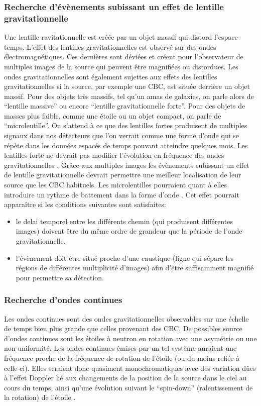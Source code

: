\subsubsection*{Recherche d'évènements subissant un effet de lentille gravitationnelle}
Une lentille ravitationnelle est créée par un objet massif qui distord l'espace-temps.
L'effet des lentilles gravitationnelles est observé sur des ondes électromagnétiques.
Ces dernières sont déviées et créent pour l'observateur de multiples images de la source qui peuvent être magnifiées ou distordues.
Les ondes gravitationnelles sont également sujettes aux effets des lentilles gravitationnelles si la source, par exemple une CBC, est située derrière un objet massif.
Pour des objets très massifs, tel qu'un amas de galaxies, on parle alors de ``lentille massive'' ou encore ``lentille gravitationnelle forte''.
Pour des objets de masses plus faible, comme une étoile ou un objet compact, on parle de ``microlentille''.
On s'attend à ce que des lentilles fortes produisent de multiples signaux dans nos détecteurs que l'on verrait comme une forme d'onde qui se répète dans les données espacés de temps pouvant atteindre quelques mois.
Les lentilles forte ne devrait pas modifier l'évolution en fréquence des ondes gravitationnelles \cite{LVK_lensing}.
Grâce aux  multiples images les évènements subissant un effet de lentille gravitationnelle devrait permettre une meilleur localisation de leur source que les CBC habituels.
Les microlentilles pourraient quant à elles introduire un rythme de battement dans la forme d'onde \cite{lensing_beating}.
Cet effet pourrait apparaître si les conditions suivantes sont satisfaites:
\begin{itemize}
\item le delai temporel entre les différents chemin (qui produisent différentes images) doivent être du même ordre de grandeur que la période de l'onde gravitationnelle.
\item l'évènement doit être situé proche d'une caustique (ligne qui sépare les régions de différentes multiplicité d'images) afin d'être suffisamment magnifié pour permettre sa détection.
\end{itemize}

\subsubsection*{Recherche d'ondes continues}
Les ondes continues sont des ondes gravitationnelles observables sur une échelle de temps bien plus grande que celles provenant des CBC.
De possibles source d'ondes continues sont les étoiles à neutron en rotation avec une asymétrie ou une non-uniformité.
Les ondes continues émises par un tel système auraient une fréquence proche de la fréquence de rotation de l'étoile (ou du moins reliée à celle-ci).
Elles seraient donc quasiment monochromatiques avec des variation dûes à l'effet Doppler lié aux changements de la position de la source dans le ciel au cours du temps, ainsi qu'une évolution suivant le ``spin-down'' (ralentissement de la rotation) de l'étoile \cite{LVK_cw}.

